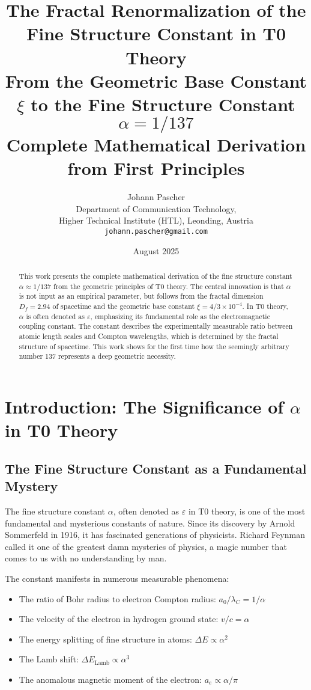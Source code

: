 \documentclass[12pt,a4paper]{article}
\title{\textbf{The Fractal Renormalization of the Fine Structure Constant in T0 Theory}\\[0.5cm]
	\large From the Geometric Base Constant $\xi$ to the Fine Structure Constant $\alpha = 1/137$\\[0.3cm]
	\normalsize Complete Mathematical Derivation from First Principles}
\author{Johann Pascher\\
	\small Department of Communication Technology,\\
	\small Higher Technical Institute (HTL), Leonding, Austria\\
	\small \texttt{johann.pascher@gmail.com}}
\date{August 2025}
\theoremstyle{definition}
\begin{document}
	
	\maketitle
	
	\begin{abstract}
		This work presents the complete mathematical derivation of the fine structure constant $\alpha \approx 1/137$ from the geometric principles of T0 theory. The central innovation is that $\alpha$ is not input as an empirical parameter, but follows from the fractal dimension $D_f = 2.94$ of spacetime and the geometric base constant $\xi = 4/3 \times 10^{-4}$. In T0 theory, $\alpha$ is often denoted as $\varepsilon$, emphasizing its fundamental role as the electromagnetic coupling constant. The constant describes the experimentally measurable ratio between atomic length scales and Compton wavelengths, which is determined by the fractal structure of spacetime. This work shows for the first time how the seemingly arbitrary number 137 represents a deep geometric necessity.
	\end{abstract}
	
	\tableofcontents
	\newpage
	
	\section{Introduction: The Significance of $\alpha$ in T0 Theory}
	
	\subsection{The Fine Structure Constant as a Fundamental Mystery}
	
	The fine structure constant $\alpha$, often denoted as $\varepsilon$ in T0 theory, is one of the most fundamental and mysterious constants of nature. Since its discovery by Arnold Sommerfeld in 1916, it has fascinated generations of physicists. Richard Feynman called it one of the greatest damn mysteries of physics, a magic number that comes to us with no understanding by man.
	
	The constant manifests in numerous measurable phenomena:
	\begin{itemize}
		\item The ratio of Bohr radius to electron Compton radius: $a_0/\lambda_C = 1/\alpha$
		\item The velocity of the electron in hydrogen ground state: $v/c = \alpha$
		\item The energy splitting of fine structure in atoms: $\Delta E \propto \alpha^2$
		\item The Lamb shift: $\Delta E_{\text{Lamb}} \propto \alpha^3$
		\item The anomalous magnetic moment of the electron: $a_e \propto \alpha/\pi$
	\end{itemize}
	
\end{document}
